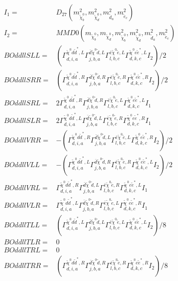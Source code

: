 \documentclass[A4,landscape]{article}
\begin{document}
\begin{align} 
I_1 = & D_{27}(m^2_{\tilde{\chi}^0_{{b}}}, m^2_{\tilde{\chi}^0_{{d}}}, m^2_{\tilde{d}_{{a}}}, m^2_{\tilde{e}_{{c}}}) \\ 
I_2 = & MMD0(m_{\tilde{\chi}^0_{{b}}}, m_{\tilde{\chi}^0_{{d}}}, m^2_{\tilde{\chi}^0_{{b}}}, m^2_{\tilde{\chi}^0_{{d}}}, m^2_{\tilde{d}_{{a}}}, m^2_{\tilde{e}_{{c}}}) \\ 
  BOddllSLL= & ( \Gamma^{\tilde{\chi}^0 d \tilde{d}^*,L}_{d, i, a} \Gamma^{\bar{d}\tilde{\chi}^0 \tilde{d} ,L}_{j, b, a} \Gamma^{\bar{e}\tilde{\chi}^0 \tilde{e} ,L}_{l, b, c} \Gamma^{\tilde{\chi}^0 e \tilde{e}^*,L}_{d, k, c} I_2)/2 \\ 
  BOddllSRR= & ( \Gamma^{\tilde{\chi}^0 d \tilde{d}^*,R}_{d, i, a} \Gamma^{\bar{d}\tilde{\chi}^0 \tilde{d} ,R}_{j, b, a} \Gamma^{\bar{e}\tilde{\chi}^0 \tilde{e} ,R}_{l, b, c} \Gamma^{\tilde{\chi}^0 e \tilde{e}^*,R}_{d, k, c} I_2)/2 \\ 
  BOddllSRL= & 2  \Gamma^{\tilde{\chi}^0 d \tilde{d}^*,R}_{d, i, a} \Gamma^{\bar{d}\tilde{\chi}^0 \tilde{d} ,R}_{j, b, a} \Gamma^{\bar{e}\tilde{\chi}^0 \tilde{e} ,L}_{l, b, c} \Gamma^{\tilde{\chi}^0 e \tilde{e}^*,L}_{d, k, c} I_1 \\ 
  BOddllSLR= & 2  \Gamma^{\tilde{\chi}^0 d \tilde{d}^*,L}_{d, i, a} \Gamma^{\bar{d}\tilde{\chi}^0 \tilde{d} ,L}_{j, b, a} \Gamma^{\bar{e}\tilde{\chi}^0 \tilde{e} ,R}_{l, b, c} \Gamma^{\tilde{\chi}^0 e \tilde{e}^*,R}_{d, k, c} I_1 \\ 
  BOddllVRR= & -( \Gamma^{\tilde{\chi}^0 d \tilde{d}^*,R}_{d, i, a} \Gamma^{\bar{d}\tilde{\chi}^0 \tilde{d} ,L}_{j, b, a} \Gamma^{\bar{e}\tilde{\chi}^0 \tilde{e} ,L}_{l, b, c} \Gamma^{\tilde{\chi}^0 e \tilde{e}^*,R}_{d, k, c} I_2)/2 \\ 
  BOddllVLL= & -( \Gamma^{\tilde{\chi}^0 d \tilde{d}^*,L}_{d, i, a} \Gamma^{\bar{d}\tilde{\chi}^0 \tilde{d} ,R}_{j, b, a} \Gamma^{\bar{e}\tilde{\chi}^0 \tilde{e} ,R}_{l, b, c} \Gamma^{\tilde{\chi}^0 e \tilde{e}^*,L}_{d, k, c} I_2)/2 \\ 
  BOddllVRL= &  \Gamma^{\tilde{\chi}^0 d \tilde{d}^*,R}_{d, i, a} \Gamma^{\bar{d}\tilde{\chi}^0 \tilde{d} ,L}_{j, b, a} \Gamma^{\bar{e}\tilde{\chi}^0 \tilde{e} ,R}_{l, b, c} \Gamma^{\tilde{\chi}^0 e \tilde{e}^*,L}_{d, k, c} I_1 \\ 
  BOddllVLR= &  \Gamma^{\tilde{\chi}^0 d \tilde{d}^*,L}_{d, i, a} \Gamma^{\bar{d}\tilde{\chi}^0 \tilde{d} ,R}_{j, b, a} \Gamma^{\bar{e}\tilde{\chi}^0 \tilde{e} ,L}_{l, b, c} \Gamma^{\tilde{\chi}^0 e \tilde{e}^*,R}_{d, k, c} I_1 \\ 
  BOddllTLL= & ( \Gamma^{\tilde{\chi}^0 d \tilde{d}^*,L}_{d, i, a} \Gamma^{\bar{d}\tilde{\chi}^0 \tilde{d} ,L}_{j, b, a} \Gamma^{\bar{e}\tilde{\chi}^0 \tilde{e} ,L}_{l, b, c} \Gamma^{\tilde{\chi}^0 e \tilde{e}^*,L}_{d, k, c} I_2)/8 \\ 
  BOddllTLR= & 0 \\ 
  BOddllTRL= & 0 \\ 
  BOddllTRR= & ( \Gamma^{\tilde{\chi}^0 d \tilde{d}^*,R}_{d, i, a} \Gamma^{\bar{d}\tilde{\chi}^0 \tilde{d} ,R}_{j, b, a} \Gamma^{\bar{e}\tilde{\chi}^0 \tilde{e} ,R}_{l, b, c} \Gamma^{\tilde{\chi}^0 e \tilde{e}^*,R}_{d, k, c} I_2)/8 \\ 
\end{align} 
\end{document}
